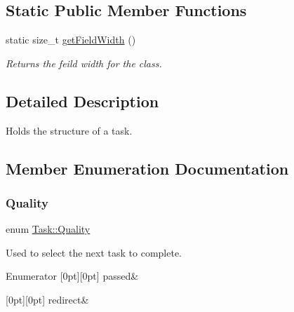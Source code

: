 \subsection*{Static Public Member Functions}
\begin{DoxyCompactItemize}
\item 
static size\+\_\+t \mbox{\hyperlink{class_task_a18f265f8b4a37e5ed047034c2558068b}{get\+Field\+Width}} ()
\begin{DoxyCompactList}\small\item\em Returns the feild width for the class. \end{DoxyCompactList}\end{DoxyCompactItemize}


\subsection{Detailed Description}
Holds the structure of a task. 

\subsection{Member Enumeration Documentation}
\mbox{\label{class_task_a6b8b1fc5858cbd77055e79d6381282fb}} 
\subsubsection{\texorpdfstring{Quality}{Quality}}
{\footnotesize\ttfamily enum \mbox{\hyperlink{class_task_a6b8b1fc5858cbd77055e79d6381282fb}{Task\+::\+Quality}}}



Used to select the next task to complete. 

\begin{DoxyEnumFields}{Enumerator}
[0pt][0pt]{}\mbox{\label{class_task_a6b8b1fc5858cbd77055e79d6381282fbafc26836e15aeaddaab5eaca6d03dadba}} 
passed&\\
\hline

[0pt][0pt]{}\mbox{\label{class_task_a6b8b1fc5858cbd77055e79d6381282fba9a7ec146540b101a16e2da2bd61e5b59}} 
redirect&\\
\hline

\end{DoxyEnumFields}


